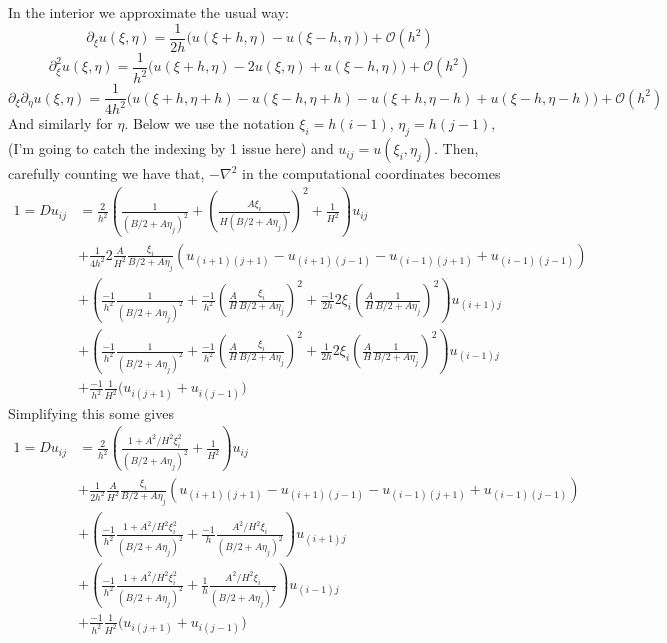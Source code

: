 \documentclass[12pt]{article}
\def\O{\mathcal O}
\let\p\partial
\begin{document}
\begin{problems}
In the interior we approximate the usual way:
$$\p_\xi u(\xi, \eta) = \frac{1}{2h} \big(u(\xi + h, \eta)
- u(\xi - h, \eta)\big) + \O(h^2)$$
$$\p_\xi^2 u(\xi, \eta) = \frac{1}{h^2} \big(u(\xi + h, \eta) -2 u(\xi, \eta) 
+ u(\xi - h, \eta)\big) + \O(h^2)$$
$$\p_\xi\p_\eta u(\xi, \eta) = \frac{1}{4h^2} \big(u(\xi+h, \eta + h) -u(\xi-h, \eta+h) 
- u(\xi + h, \eta - h) + u(\xi - h, \eta - h)\big) + \O(h^2)$$
And similarly for $\eta$. Below we use the 
notation $\xi_i = h(i-1)$, $\eta_j = h(j-1)$, (I'm going to catch the indexing by 
1 issue here) and $u_{ij} = u(\xi_i, \eta_j)$.
Then, carefully counting we have that, $-\nabla^2$ in the 
computational coordinates becomes
\begin{align*}
1 = D u_{ij} &= \frac2{h^2}\left(\frac1{(B/2 + A\eta_j)^2} 
    + \left(\frac{A\xi_i}{H(B/2 + A\eta_j)}\right)^2 +  \frac1{H^2}\right) u_{ij}\\
             &+\frac1{4h^2}2\frac{A}{H^2}\frac{\xi_i}{B/2 + A\eta_j} 
             \left(u_{(i+1)(j+1)} - u_{(i+1)(j-1)} - u_{(i-1)(j+1)} + u_{(i-1)(j-1)}\right)\\
             &+\left(\frac{-1}{h^2}\frac{1}{(B/2 + A\eta_j)^2} 
         + \frac{-1}{h^2} \left(\frac{A}{H} \frac{\xi_i}{B/2 + A\eta_j} \right)^2
     +\frac{-1}{2h}2\xi_i\left(\frac AH\frac 1{B/2 + A\eta_j} \right)^2
 \right)u_{(i+1)j}\\
             &+\left(\frac{-1}{h^2}\frac{1}{(B/2 + A\eta_j)^2} 
         + \frac{-1}{h^2} \left(\frac{A}{H} \frac{\xi_i}{B/2 + A\eta_j} \right)^2
     +\frac{1}{2h}2\xi_i\left(\frac AH\frac 1{B/2 + A\eta_j} \right)^2
 \right)u_{(i-1)j}\\
             &+\frac{-1}{h^2}\frac 1{H^2} \big(u_{i(j+1)} + u_{i(j-1)}\big)
\end{align*}
Simplifying this some gives 
\begin{align*}
1 = D u_{ij} &= \frac2{h^2}\left(\frac{1+ A^2/H^2 \xi_i^2}{(B/2 + A\eta_j)^2} 
+ \frac1{H^2}\right) u_{ij}\\
             &+\frac1{2h^2}\frac{A}{H^2}\frac{\xi_i}{B/2 + A\eta_j} 
             \left(u_{(i+1)(j+1)} - u_{(i+1)(j-1)} - u_{(i-1)(j+1)} + u_{(i-1)(j-1)}\right)\\
             &+\left(\frac{-1}{h^2}\frac{1+A^2/H^2 \xi_i^2}{(B/2 + A\eta_j)^2} 
             +\frac{-1}{h}\frac {A^2/H^2\xi_i}{(B/2 + A\eta_j)^2}
 \right)u_{(i+1)j}\\
             &+\left(\frac{-1}{h^2}\frac{1+A^2/H^2 \xi_i^2}{(B/2 + A\eta_j)^2} 
             +\frac{1}{h}\frac {A^2/H^2\xi_i}{(B/2 + A\eta_j)^2}
 \right)u_{(i-1)j}\\
             &+\frac{-1}{h^2}\frac 1{H^2} \big(u_{i(j+1)} + u_{i(j-1)}\big)
\end{align*}


\end{problems}
\end{document}

